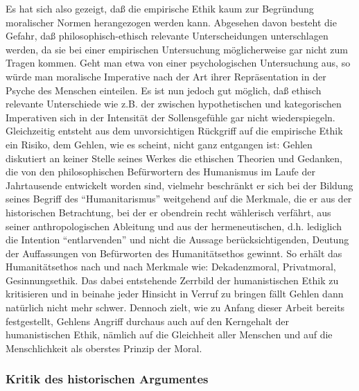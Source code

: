 \documentclass[12pt,a4paper]{article}
\begin{document}
Es hat sich also gezeigt, daß die empirische Ethik kaum zur Begründung
moralischer Normen herangezogen werden kann. Abgesehen davon besteht
die Gefahr, daß philosophisch-ethisch relevante Unterscheidungen
unterschlagen werden, da sie bei einer empirischen Untersuchung
möglicherweise gar nicht zum Tragen kommen. Geht man etwa von einer
psychologischen Untersuchung aus, so würde man moralische Imperative
nach der Art ihrer Repräsentation in der Psyche des Menschen
einteilen. Es ist nun jedoch gut möglich, daß ethisch relevante
Unterschiede wie z.B. der zwischen hypothetischen und kategorischen
Imperativen sich in der Intensität der Sollensgefühle gar nicht
wiederspiegeln. Gleichzeitig entsteht aus dem unvorsichtigen Rückgriff
auf die empirische Ethik ein Risiko, dem Gehlen, wie es scheint, nicht
ganz entgangen ist: Gehlen diskutiert an keiner Stelle seines Werkes
die ethischen Theorien und Gedanken, die von den philosophischen
Befürwortern des Humanismus im Laufe der Jahrtausende entwickelt
worden sind, vielmehr beschränkt er sich bei der Bildung seines
Begriff des "`Humanitarismus"' weitgehend auf die Merkmale, die er aus
der historischen Betrachtung, bei der er obendrein recht wählerisch
verfährt, aus seiner anthropologischen Ableitung und aus der
hermeneutischen, d.h.  lediglich die Intention "`entlarvenden"' und
nicht die Aussage berücksichtigenden, Deutung der Auffassungen von
Befürworten des Humanitätsethos gewinnt. So erhält das Humanitätsethos
nach und nach Merkmale wie: Dekadenzmoral, Privatmoral,
Gesinnungsethik. Das dabei entstehende Zerrbild der humanistischen
Ethik zu kritisieren und in beinahe jeder Hinsicht in Verruf zu
bringen fällt Gehlen dann natürlich nicht mehr schwer. Dennoch zielt,
wie zu Anfang dieser Arbeit bereits festgestellt, Gehlens Angriff
durchaus auch auf den Kerngehalt der humanistischen Ethik, nämlich auf
die Gleichheit aller Menschen und auf die Menschlichkeit als oberstes
Prinzip der Moral.

\subsubsection{Kritik des historischen Argumentes}
\end{document}
